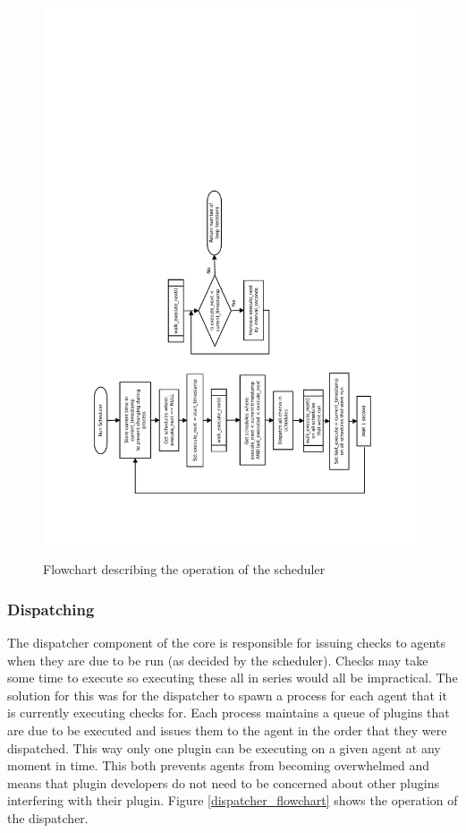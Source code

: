 \documentclass[bsc,deptreport,twoside,parskip,singlespacing,notimes]{infthesis}
\begin{document}
\begin{figure}[H]
	\caption{Flowchart describing the operation of the scheduler}
	\includegraphics[scale=0.7, angle=-90]{assets/scheduler_flowchart.pdf}
	\label{scheduler_flowchart}
\end{figure}


\subsubsection{Dispatching}

	The dispatcher component of the core is responsible for issuing checks to
	agents when they are due to be run (as decided by the scheduler).  Checks may
	take some time to execute so executing these all in series would all be
	impractical. The solution for this was for the dispatcher to spawn a process
	for each agent that it is currently executing checks for.  Each process
	maintains a queue of plugins that are due to be executed and issues them to the
	agent in the order that they were dispatched.  This way only one plugin can be
	executing on a given agent at any moment in time.  This both prevents agents
	from becoming overwhelmed and means that plugin developers do not need to be
	concerned about other plugins interfering with their plugin.  Figure
	\ref{dispatcher_flowchart} shows the operation of the dispatcher.
\end{document}
